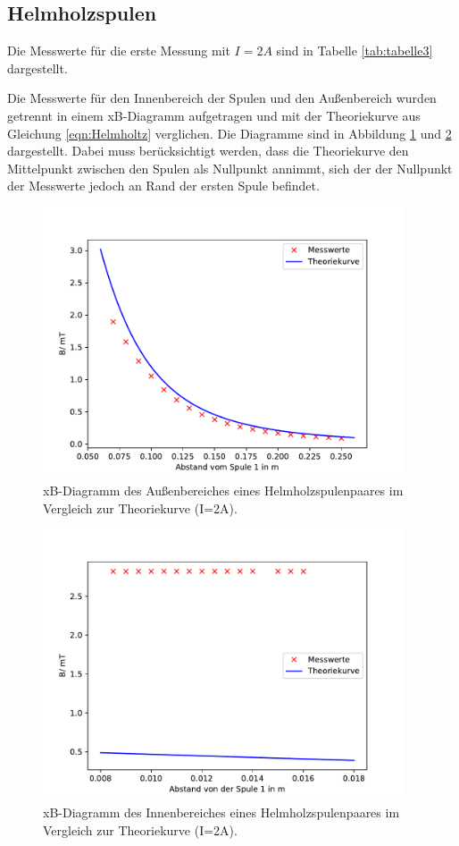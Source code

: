 \subsection{Helmholzspulen}
\noindent Die Messwerte für die erste Messung mit $I=2A$
sind in Tabelle \ref{tab:tabelle3} dargestellt.

Die Messwerte für den Innenbereich der Spulen und den
Außenbereich wurden getrennt in einem xB-Diagramm
aufgetragen und mit der Theoriekurve aus Gleichung \ref{eqn:Helmholtz}
verglichen. Die Diagramme sind in Abbildung
\ref{fig:Helmholz1} und \ref{fig:Helmholz1I}
dargestellt. Dabei muss berücksichtigt werden, dass die
Theoriekurve den Mittelpunkt zwischen den Spulen als
Nullpunkt annimmt, sich der der Nullpunkt der
Messwerte jedoch an Rand der ersten Spule befindet.
\begin{figure}[H]
  \centering
  \includegraphics[height=8cm]{Helmholz1.pdf}
  \caption{xB-Diagramm des Außenbereiches eines
  Helmholzspulenpaares im Vergleich zur Theoriekurve
  (I=2A).}
  \label{fig:Helmholz1}
\end{figure}
\begin{figure}[H]
  \centering
  \includegraphics[height=8cm]{Helmholz1I.pdf}
  \caption{xB-Diagramm des Innenbereiches eines
  Helmholzspulenpaares im Vergleich zur Theoriekurve
  (I=2A).}
  \label{fig:Helmholz1I}
\end{figure}

